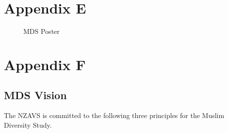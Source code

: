 \documentclass[
]{interact}
\begin{document}
\newpage{}

\section{Appendix E}\label{appendix-e}

\begin{figure}


\caption{\label{fig-appendfig1}MDS Poster}

\end{figure}%

\newpage{}

\section{Appendix F}\label{appendix-f}

\subsection{MDS Vision}\label{mds-vision}

The NZAVS is committed to the following three principles for the Muslim
Diversity Study.
\end{document}
